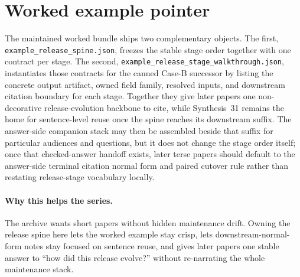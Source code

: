 \documentclass[11pt]{article}
\begin{document}
\section{Worked example pointer}
The maintained worked bundle ships two complementary objects.\cite{series:workedexample}
The first, \texttt{example\_release\_spine.json}, freezes the stable stage order together with one contract per stage.
The second, \texttt{example\_release\_stage\_walkthrough.json}, instantiates those contracts for the canned Case-B successor by listing the concrete output artifact, owned field family, resolved inputs, and downstream citation boundary for each stage.
Together they give later papers one non-decorative release-evolution backbone to cite, while Synthesis~31 remains the home for sentence-level reuse once the spine reaches its downstream suffix. The answer-side companion stack may then be assembled beside that suffix for particular audiences and questions, but it does not change the stage order itself; once that checked-answer handoff exists, later terse papers should default to the answer-side terminal citation normal form and paired cutover rule rather than restating release-stage vocabulary locally.\cite{series:challengeanswercapsules,series:challengeanswersheets,series:challengeanswercards,series:challengeanswercarrierslots,series:challengeansweraudittrails,series:challengeanswercitationdockets,series:challengeanswerpublicationprofiles,series:challengeanswerdisclosurepackets,series:challengeanswerescalationladders,series:challengeanswerreviewmenus,series:pairedterminalcitationdiscipline,series:pairedterminalcutoverrules}

\paragraph{Why this helps the series.}
The archive wants short papers without hidden maintenance drift.
Owning the release spine here lets the worked example stay crisp, lets downstream-normal-form notes stay focused on sentence reuse, and gives later papers one stable answer to ``how did this release evolve?'' without re-narrating the whole maintenance stack.
\end{document}
